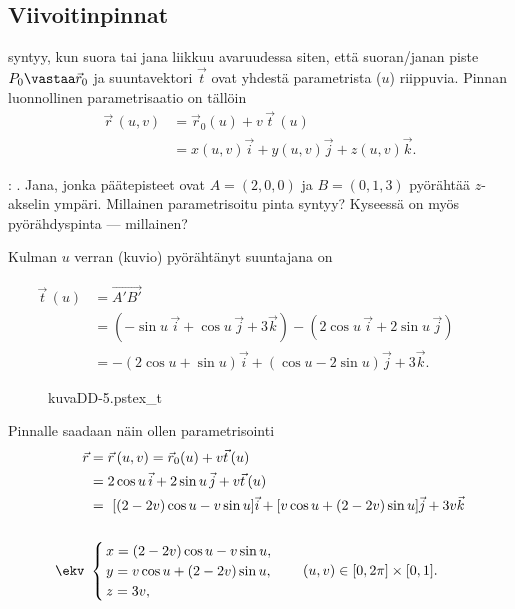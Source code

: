 \subsection*{Viivoitinpinnat}

 syntyy, kun suora tai jana liikkuu avaruudessa siten, että suoran/janan
piste $P_0\vastaa\vec r_0$ ja suuntavektori $\vec t$ ovat yhdestä parametrista ($u$) riippuvia.
Pinnan luonnollinen parametrisaatio on tällöin
\begin{align*}
\vec r\,(u,v) &= \vec r_0(u)+v\,\vec t\,(u) \\
              &= x(u,v)\vec i +y(u,v)\vec j+z(u,v)\vec k.
\end{align*}
%
\begin{Exa}: . \label{jäähdytystorni}
Jana, jonka päätepisteet ovat $A=(2,0,0)$ ja $B=(0,1,3)$ pyörähtää $z$-akselin ympäri.
Millainen parametrisoitu pinta syntyy? Kyseessä on myös pyörähdyspinta --- millainen?
\end{Exa}
\ratk Kulman $u$ verran (kuvio) pyörähtänyt suuntajana on
\begin{multicols}{2} \raggedcolumns
\begin{align*}
\vec t\,(u) 
&= \overrightarrow{A'B'} \\
&= (-\sin u\,\vec i + \cos u\,\vec j + 3\vec k) -(2\cos u\,\vec i + 2\sin u\, \vec j) \qquad \\
&=-(2\cos u+\sin u)\vec i + (\cos u-2\sin u)\vec j +3\vec k.
\end{align*}
\begin{figure}[H]
\begin{center}
{kuvaDD-5.pstex_t}
\end{center}
\end{figure}
\end{multicols}
Pinnalle saadaan näin ollen parametrisointi
\begin{align*}
\vec r
&= \vec r\,(u,v)=\vec r_0(u)+v\vec t\,(u) \\
&= 2\cos u\,\vec i+2\sin u\,\vec j +v\vec t\,(u) \\
&= [(2-2v)\cos u-v\sin u]\vec i+[v\cos u +(2-2v)\sin u]\vec j+3v\vec k \\ \\
\ekv \ &\begin{cases}
\,x=(2-2v)\cos u-v\sin u, \\
\,y=v\cos u+(2-2v)\sin u, \\
\,z=3v,
\end{cases} \quad (u,v) \in [0,2\pi] \times [0,1].
\end{align*}
